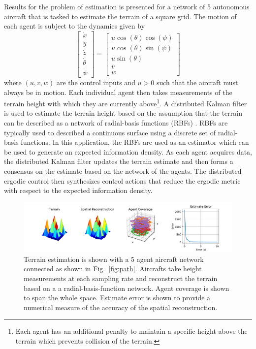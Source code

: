 \documentclass[letterpaper, 10 pt,  conference, twoside]{IEEEtran/IEEEtran}
\theoremstyle{definition}
\begin{document}
Results for the problem of estimation is presented for a network of 5 autonomous aircraft that is tasked to estimate the terrain of a square grid. The motion of each agent is subject to the dynamics given by
\begin{equation*}
\begin{bmatrix}
\dot{x}  \\
\dot{y} \\
\dot{z} \\
\dot{\theta} \\
\dot{\psi}
\end{bmatrix} =
\begin{bmatrix}
u \cos(\theta) \cos(\psi) \\
u \cos(\theta) \sin(\psi) \\
u \sin(\theta) \\
v \\
w
\end{bmatrix}
\end{equation*}
where $(u,v,w)$ are the control inputs and $u > 0$ such that the aircraft must always be in motion. Each individual agent then takes measurements of the terrain height with which they are currently above\footnote{Each agent has an additional penalty to maintain a specific height above the terrain which prevents collision of the terrain.}. A distributed Kalman filter is used to estimate the terrain height based on the assumption that the terrain can be described as a network of radial-basis functions (RBFs) \cite{du2014radial}. RBFs are typically used to described a continuous surface using a discrete set of radial-basis functions. In this application, the RBFs are used as an estimator which can be used to generate an expected information density. As each agent acquires data, the distributed Kalman filter updates the terrain estimate and then forms a consensus on the estimate based on the network of the agents. The distributed ergodic control then synthesizes control actions that reduce the ergodic metric with respect to the expected information density.

\begin{figure}[!th]
\centering
\includegraphics[scale=0.6]{figures/terrain_estimation.pdf}
\caption{ Terrain estimation is shown with a 5 agent aircraft network connected as shown in Fig.~\ref{fig:path}. Aircrafts take height measurements at each sampling rate and reconstruct the terrain based on a a radial-basis-function network. Agent coverage is shown to span the whole space. Estimate error is shown to provide a numerical measure of the accuracy of the spatial reconstruction.  }
\label{fig:estimation}
\end{figure}
\end{document}

